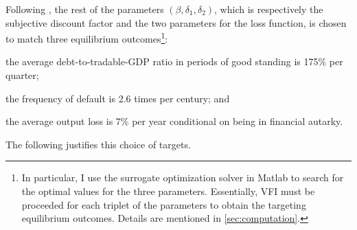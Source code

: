Following \citet{Na-18}, the rest of the parameters $\left( \beta, \delta_1, \delta_2 \right)$, which is respectively the subjective discount factor and the two parameters for the loss function, is chosen to match three equilibrium outcomes\footnote{
    In particular, I use the surrogate optimization solver in Matlab to search for the optimal values for the three parameters. Essentially, VFI must be proceeded for each triplet of the parameters to obtain the targeting equilibrium outcomes. Details are mentioned in \autoref{sec:computation}.
}:
\begin{enumerate*}[label = (\roman*)]
    \item the average debt-to-tradable-GDP ratio in periods of good standing is 175\% per quarter;
    \item the frequency of default is 2.6 times per century; and
    \item the average output loss is 7\% per year conditional on being in financial autarky.
\end{enumerate*}
The following justifies this choice of targets.
